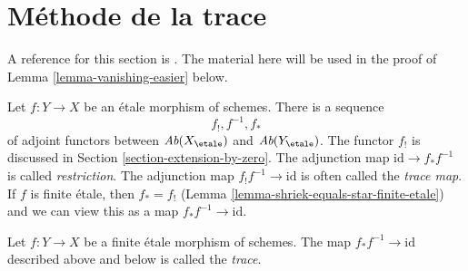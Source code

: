 \section{M\'ethode de la trace}
\label{section-trace-method}

\noindent
A reference for this section is \cite[Expos\'e IX, \S 5]{SGA4}.
The material here will be used in the proof of
Lemma \ref{lemma-vanishing-easier} below.

\medskip\noindent
Let $f : Y \to X$ be an \'etale morphism of schemes. There
is a sequence
$$
f_!, f^{-1}, f_*
$$
of adjoint functors between
$\textit{Ab}(X_\etale)$ and $\textit{Ab}(Y_\etale)$.
The functor $f_!$ is discussed in Section \ref{section-extension-by-zero}.
The adjunction map $\text{id} \to f_* f^{-1}$ is called {\it restriction}.
The adjunction map $f_! f^{-1} \to \text{id}$ is often
called the {\it trace map}. If $f$ is finite \'etale, then $f_* = f_!$
(Lemma \ref{lemma-shriek-equals-star-finite-etale}) and
we can view this as a map $f_*f^{-1} \to \text{id}$.

\begin{definition}
\label{definition-trace-map}
Let $f : Y \to X$ be a finite \'etale morphism of schemes.
The map $f_* f^{-1} \to \text{id}$ described above and below
is called the {\it trace}.
\end{definition}

